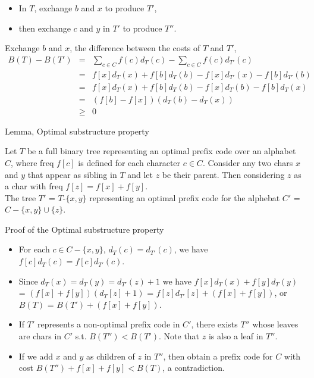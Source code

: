 \documentclass{beamer}
\begin{document}
\begin{frame}{}
\begin{itemize}
\item In $T$, exchange $b$ and $x$ to produce $T'$, 
\item then exchange $c$ and $y$ in $T'$
to produce $T''$.  
\end{itemize}
Exchange $b$ and $x$, the difference between the costs of $T$ and $T'$,
\begin{eqnarray*}
B(T)-B(T') &=& \sum_{c\in C} f(c)d_T(c) - \sum_{c\in C}f(c)d_{T'}(c) \\
 &=& f[x]d_T(x)+f[b]d_T(b)-f[x]d_{T'}(x) - f[b]d_{T'}(b) \\
 &=& f[x]d_T(x)+f[b]d_T(b)-f[x]d_T(b)-f[b]d_T(x) \\
 &=& (f[b]-f[x])(d_T(b)-d_T(x)) \\
 &\ge & 0
\end{eqnarray*}
\end{frame}

\begin{frame}{}
\begin{center}
{\large Lemma, Optimal substructure property}
\end{center}
Let $T$ be a full binary tree representing an optimal prefix code over
 an alphabet $C$, where freq $f[c]$ is defined for each character $c\in C$. 
Consider any two chars $x$ and $y$ that appear as sibling in $T$ and
 let $z$ be their parent.  Then considering $z$ as a char with freq
$f[z]=f[x]+f[y]$.  \\
The tree $T'$ = $T$-$\{x,y \}$ representing an optimal prefix code
 for the alphebat $C'$ = $C-\{x,y\}\cup\{z\}$.  
\end{frame}

\begin{frame}{}
\begin{center}
{\large Proof of the Optimal substructure property}
\end{center}
\begin{itemize}
\item For each $c\in C-\{x,y\}$, $d_T(c)=d_{T'}(c)$, we have 
$f[c]d_T(c)=f[c]d_{T'}(c)$. 
\item Since $d_T(x)=d_T(y)=d_{T'}(z)+1$ we have
$f[x]d_T(x) + f[y]d_T(y)$ = $(f[x]+f[y])(d_T[z]+1)$
 = $f[z]d_{T'}[z]+(f[x]+f[y])$, or $B(T)$ = $B(T')+(f[x]+f[y])$.  
\item If $T'$ represents a non-optimal prefix code in $C'$, there 
exists $T''$ whose leaves are chars in $C'$ s.t. $B(T'')<B(T')$.  
Note that $z$ is also a leaf in $T''$.  
\item If we add $x$ and $y$ as children of $z$ in $T''$, then obtain a prefix code
for $C$ with cost $B(T'')+f[x]+f[y] < B(T)$, a contradiction.  
\end{itemize}
\end{frame}
\end{document}
